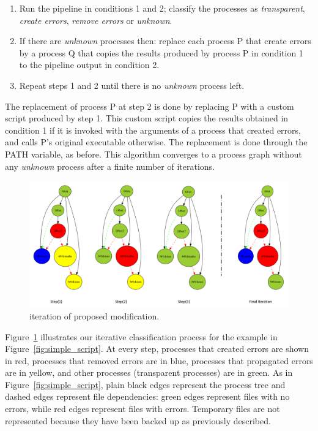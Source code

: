 \documentclass[a4paper,num-refs]{oup-contemporary}
\begin{document}
\begin{enumerate}
  \item Run the pipeline in conditions 1 and 2; classify the
    processes as \emph{transparent}, \emph{create errors},
    \emph{remove errors} or \emph{unknown}.
  \item If there are \emph{unknown} processes then: replace each 
  process P that create errors by a process Q that copies the results 
  produced by process P in condition 1 to the pipeline output in 
  condition 2. 
  \item Repeat steps 1 and 2 until there is no \emph{unknown} process left.
\end{enumerate}

The replacement of process P at step 2 is done by replacing P with a 
custom script produced by step 1. This custom script copies the results 
obtained in condition 1 if it is invoked with the arguments of a 
process that created errors, and calls P's original executable 
otherwise. The replacement is done through the PATH variable, as 
before. This algorithm converges to a process graph without any 
\emph{unknown} process after a finite number of iterations.

\begin{figure}
  \centering
  \includegraphics[width=\columnwidth]{images/iterative_modif}
  \caption{iteration of proposed modification.}
  \label{fig:iterations}
\end{figure}

Figure~\ref{fig:iterations} illustrates our iterative classification 
process for the example in Figure~\ref{fig:simple_script}. At every 
step, processes that created errors are shown in red, processes that 
removed errors are in blue, processes that propagated errors are in 
yellow, and other processes (transparent processes) are in green. As in 
Figure~\ref{fig:simple_script}, plain black edges represent the process 
tree and dashed edges represent file dependencies: green edges 
represent files with no errors, while red edges represent files with 
errors. Temporary files are not represented because they have been 
backed up as previously described.
\end{document}
